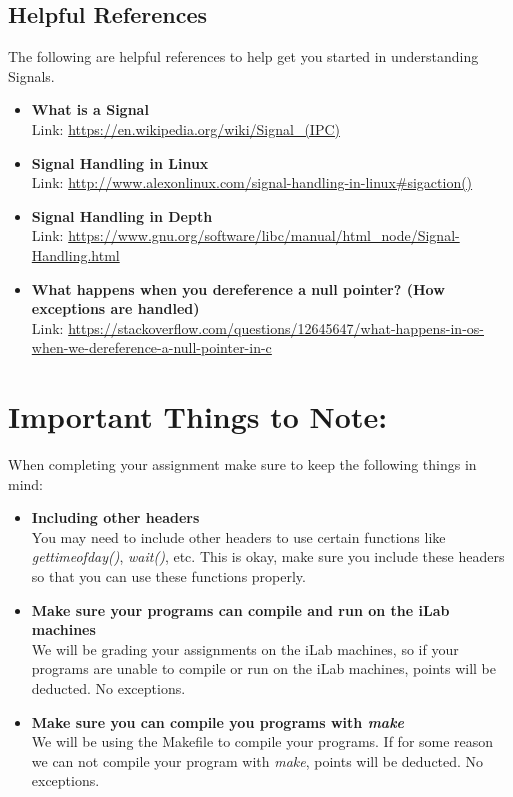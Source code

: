 \documentclass{article}
\begin{document}
\subsection*{Helpful References}
The following are helpful references to help get you started in understanding Signals.
\begin{itemize}
\item \textbf{What is a Signal} \\
Link:  \href{https://en.wikipedia.org/wiki/Signal_(IPC)}{https://en.wikipedia.org/wiki/Signal\_(IPC)}
\item \textbf{Signal Handling in Linux}\\
Link:  \href{http://www.alexonlinux.com/signal-handling-in-linux#sigaction()}{http://www.alexonlinux.com/signal-handling-in-linux\#sigaction()}
\item \textbf{Signal Handling in Depth}\\
Link:  \href{https://www.gnu.org/software/libc/manual/html_node/Signal-Handling.html}{https://www.gnu.org/software/libc/manual/html\_node/Signal-Handling.html}
\item \textbf{What happens when you dereference a null pointer? (How exceptions are handled)}\\
Link:  \href{https://stackoverflow.com/questions/12645647/what-happens-in-os-when-we-dereference-a-null-pointer-in-c}{https://stackoverflow.com/questions/12645647/what-happens-in-os-when-we-dereference-a-null-pointer-in-c}
\end{itemize}

\section*{Important Things to Note:}
When completing your assignment make sure to keep the following things in mind:
\begin{itemize}
\item \textbf{Including other headers}\\
You may need to include other headers to use certain functions like \textit{gettimeofday()}, \textit{wait()}, etc. This is okay, make sure you include these headers so that you can use these functions properly.
\item \textbf{Make sure your programs can compile and run on the iLab machines}\\
We will be grading your assignments on the iLab machines, so if your programs are unable to compile or run on the iLab machines, points will be deducted. No exceptions. 
\item \textbf{Make sure you can compile you programs with \textit{make}}\\
We will be using the Makefile to compile your programs. If for some reason we can not compile your program with \textit{make}, points will be deducted. No exceptions. 
\end{itemize}
\end{document}
